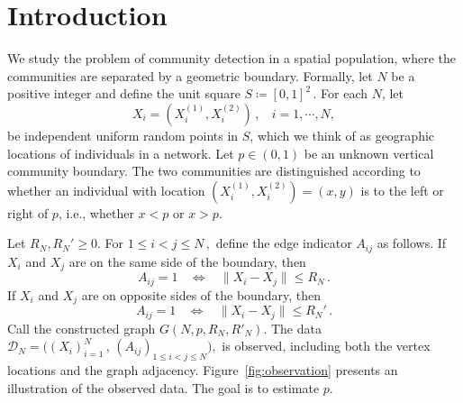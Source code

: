\documentclass[ECP,preprint]{ejpecp} %
\newcommand{\1}{\mathbf 1}
\newcommand{\cD}{\mathcal D}
\newcommand{\unitsquare}{S}
\begin{document}

\section{Introduction}
We study the problem of community detection in a spatial population, where the communities are separated by a geometric boundary. Formally, let \( N \) be a positive integer and define the unit square
\(
    \unitsquare \coloneqq [0,1]^2 \, .
\)
For each \(N\), let
\[
    X_i =(X_i^{(1)},X_i^{(2)}) \, ,  ~~~~ i = 1,\cdots,N,
\]
be independent uniform random points in \(\unitsquare\), which we think of as geographic locations of individuals in a network.  Let \(p \in (0,1)\) be an unknown vertical community boundary.  The two communities are distinguished according to whether an individual with location $(X_i^{(1)},X_i^{(2)})=(x,y)$ is to the left or right of $p$, i.e., whether $x<p$ or $x>p.$ %


Let 
\(
    R_N, R_N' \ge 0.
\)
For 
\(
    1 \le i < j \le N \, ,
\)
define the edge indicator \(A_{ij}\) as follows.  If \(X_i\) and \(X_j\) are on the same side of the boundary, then
\[
    A_{ij} = 1
    ~~~~ \Longleftrightarrow ~~~~
    \|X_i-X_j\| \le R_N \, .
\]
If \(X_i\) and \(X_j\) are on opposite sides of the boundary, then
\[
    A_{ij}=1
    ~~~~ \Longleftrightarrow ~~~~
    \|X_i-X_j\| \le R_N' \, .
\]
Call the constructed graph \( G(N,p,R_N,R'_N) \). The data
\(
    \cD_N=\big((X_i)_{i=1}^N \, , \, (A_{ij})_{1\le i<j\le N} \big),
\)
is observed, including both the vertex locations and the graph adjacency. Figure~\ref{fig:observation} presents an illustration of the observed data. The goal is to estimate \(p\).
\end{document}
